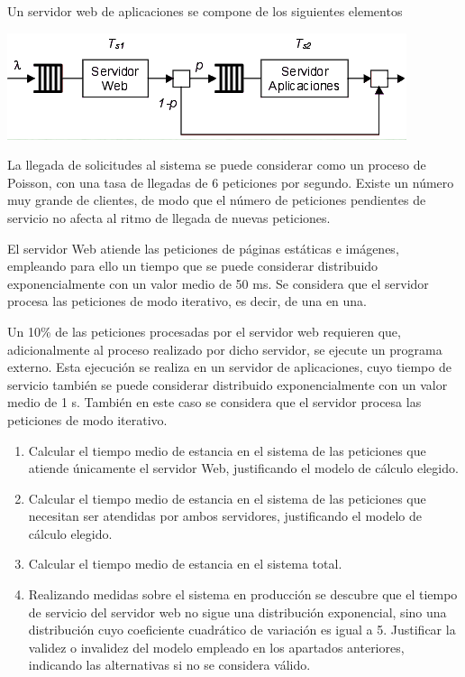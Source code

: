 \begin{problem}[10]
Un servidor web de aplicaciones se compone de los siguientes elementos

\begin{center}
  \includegraphics[keepaspectratio=true,width=\linewidth]{img/ej10.png}
\end{center}

La llegada de solicitudes al sistema se puede considerar como un proceso de Poisson, con una tasa de llegadas de 6 peticiones por segundo. Existe un número muy grande de clientes, de modo que el número de peticiones pendientes de servicio no afecta al ritmo de llegada de nuevas peticiones.

El servidor Web atiende las peticiones de páginas estáticas e imágenes, empleando para ello un tiempo que se puede considerar distribuido exponencialmente con un valor medio de 50 ms. Se considera que el servidor procesa las peticiones de modo iterativo, es decir, de una en una.

Un 10\% de las peticiones procesadas por el servidor web requieren que, adicionalmente al proceso realizado por dicho servidor, se ejecute un programa externo. Esta ejecución se realiza en un servidor de aplicaciones, cuyo tiempo de servicio también se puede considerar distribuido exponencialmente con un valor medio de 1 s. También en este caso se considera que el servidor procesa las peticiones de modo iterativo.

\begin{enumerate}
\item Calcular el tiempo medio de estancia en el sistema de las peticiones que atiende únicamente el servidor Web, justificando el modelo de cálculo elegido.

\item Calcular el tiempo medio de estancia en el sistema de las peticiones que necesitan ser atendidas por ambos servidores, justificando el modelo de cálculo elegido.

\item Calcular el tiempo medio de estancia en el sistema total.

\item Realizando medidas sobre el sistema en producción se descubre que el tiempo de servicio del servidor web no sigue una distribución exponencial, sino una distribución cuyo coeficiente cuadrático de variación es igual a 5. Justificar la validez o invalidez del modelo empleado en los apartados anteriores, indicando las alternativas si no se considera válido.
\end{enumerate}


\end{problem}
